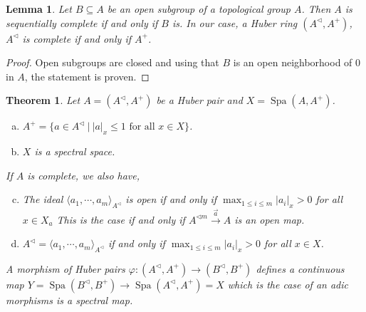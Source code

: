 \documentclass[8pt]{article}
\numberwithin{equation}{section}
\newtheorem{theorem}{Theorem} [subsection]
\newtheorem{lemma}{Lemma}[subsection]
\DeclareMathOperator{\Spa}{Spa}
\newcommand{\sep}[0]{\:|\:}
\newcommand{\ab}[1]{\vert #1 \vert}
\begin{document}
\begin{lemma}
    Let $B\subseteq A$ be an open subgroup of a topological group $A$. Then $A$ is sequentially complete if and only if $B$ is. In our case, a Huber ring $(A^\triangleleft,A^+)$, $A^\triangleleft$ is complete if and only if $A^+$. 
\end{lemma}
\begin{proof}
Open subgroups are closed and using that $B$ is an open neighborhood of $0$ in $A$, the statement is proven.
\end{proof}

\begin{theorem}
    \label{theorem_17_2}
    Let $A=(A^\triangleleft,A^+)$ be a Huber pair and $X=\Spa (A,A^+)$.
    \begin{enumerate}[a.]
        \item $A^+=\{a\in A^\triangleleft\sep \ab{a}_x\leq 1\text{ for all $x\in X$}\}$.
        \item $X$ is a spectral space.
    \end{enumerate}
    If $A$ is complete, we also have,
    \begin{enumerate}[a.]
        \setcounter{enumi}{2}
        \item The ideal $\langle a_1,\cdots,a_m\rangle_{A^\triangleleft}$ is open if and only if $\max_{1\leq i\leq m}\ab{a_i}_x>0$ for all $x\in X_a$ %
        This is the case if and only if $A^{\triangleleft m}\stackrel{\vec{a}}{\to}A$ is an open map.
        \item $A^{\triangleleft}=\langle a_1,\cdots,a_m\rangle_{A^\triangleleft}$ if and only if $\max_{1\leq i\leq m}\ab{a_i}_x>0$ for all $x\in X$.
    \end{enumerate}
    A morphism of Huber pairs $\varphi:(A^\triangleleft,A^+)\to (B^\triangleleft, B^+)$ defines a continuous map $Y=\Spa (B^\triangleleft,B^+)\to \Spa (A^\triangleleft, A^+)=X$ which is the case of an adic morphisms is a spectral map.
\end{theorem}
\end{document}
